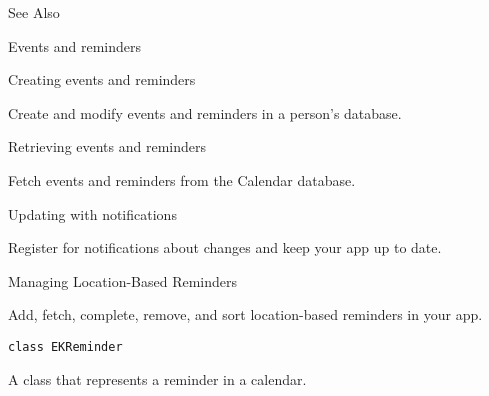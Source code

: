 \documentclass{article}
\begin{document}
See Also

Events and reminders

Creating events and reminders

Create and modify events and reminders in a person's database.

Retrieving events and reminders

Fetch events and reminders from the Calendar database.

Updating with notifications

Register for notifications about changes and keep your app up to date.

{} Managing Location-Based Reminders

Add, fetch, complete, remove, and sort location-based reminders in your app.

\texttt{class EKReminder}

A class that represents a reminder in a calendar.
\newpage
\end{document}
